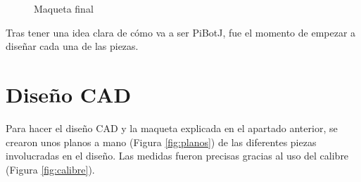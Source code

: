 \begin{figure}[ht!]
\begin{minipage}{0.4\linewidth}
		\caption*{\centering}
	\end{minipage}
	\caption{Maqueta final}
	\label{fig:maqueta2}
\end{figure}

Tras tener una idea clara de cómo va a ser PiBotJ, fue el momento de empezar a diseñar cada una de las piezas. 

\section{Diseño CAD}

Para hacer el diseño \acs{CAD} y la maqueta explicada en el apartado anterior, se crearon unos planos a mano (Figura \ref{fig:planos}) de las diferentes piezas involucradas en el diseño. Las medidas fueron precisas gracias al uso del calibre (Figura \ref{fig:calibre}).


